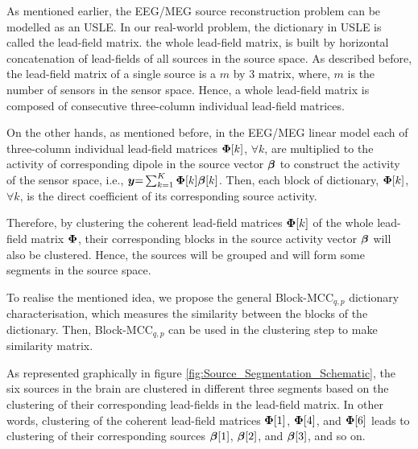 As mentioned earlier, the EEG/MEG source reconstruction problem can be modelled as an USLE.
In our real-world problem, the dictionary in USLE is called the lead-field matrix.
the whole lead-field matrix, is built by horizontal concatenation of lead-fields of all sources in the source space.
As described before, the lead-field matrix of a single source is a $m$ by 3 matrix, where, $m$ is the number of sensors in the sensor space.
Hence, a whole lead-field matrix is composed of consecutive three-column individual lead-field matrices.

On the other hands, as mentioned before, in the EEG/MEG linear model each of three-column individual lead-field matrices $\boldsymbol{\Phi} [k]$, $\forall k$, are multiplied to the activity of corresponding dipole in the source vector $\boldsymbol{\beta}$ to construct the activity of the sensor space, i.e., $\boldsymbol{y} {=} \sum_{k {=} 1}^K \boldsymbol{\Phi} [k] \boldsymbol{\beta} [k]$.
Then, each block of dictionary, $\boldsymbol{\Phi} [k]$, $\forall k$, is the direct coefficient of its corresponding source activity.

Therefore, by clustering the coherent lead-field matrices $\boldsymbol{\Phi} [k]$ of the whole lead-field matrix $\boldsymbol{\Phi}$, their corresponding blocks in the source activity vector $\boldsymbol{\beta}$ will also be clustered.
Hence, the sources will be grouped and will form some segments in the source space.

To realise the mentioned idea, we propose the general Block-MCC$_{q,p}$ dictionary characterisation, which measures the similarity between the blocks of the dictionary.
Then, Block-MCC$_{q,p}$ can be used in the clustering step to make similarity matrix.

As represented graphically in figure \ref{fig:Source_Segmentation_Schematic}, the six sources in the brain are clustered in different three segments based on the clustering of their corresponding lead-fields in the lead-field matrix.
In other words, clustering of the coherent lead-field matrices $\boldsymbol{\Phi} [1]$, $\boldsymbol{\Phi} [4]$, and $\boldsymbol{\Phi} [6]$ leads to clustering of their corresponding sources $\boldsymbol{\beta} [1]$, $\boldsymbol{\beta} [2]$, and $\boldsymbol{\beta} [3]$, and so on.

\FloatBarrier
